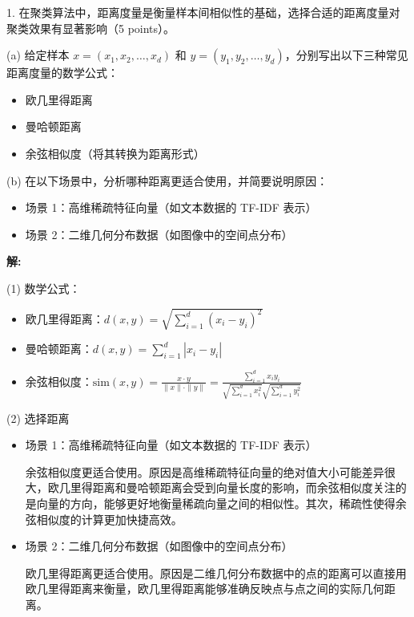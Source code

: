 \documentclass[8pt]{article}
\begin{document}
1. 
在聚类算法中，距离度量是衡量样本间相似性的基础，选择合适的距离度量对聚类效果有显著影响（5 points）。  

(a) 给定样本 \( x = (x_1, x_2, \dots, x_d) \) 和 \( y = (y_1, y_2, \dots, y_d) \)，分别写出以下三种常见距离度量的数学公式： 
\begin{itemize}
    \item 欧几里得距离  
    \item 曼哈顿距离
    \item 余弦相似度（将其转换为距离形式）  
\end{itemize}

(b) 在以下场景中，分析哪种距离更适合使用，并简要说明原因：  
\begin{itemize}
    \item 场景 1：高维稀疏特征向量（如文本数据的 TF-IDF 表示）   
    \item 场景 2：二维几何分布数据（如图像中的空间点分布）  
\end{itemize}

\textbf{\large 解:}

(1) 数学公式：
\begin{itemize}
    \item 欧几里得距离：\( d(x, y) = \sqrt{\sum_{i=1}^d (x_i - y_i)^2} \)
    \item 曼哈顿距离：\( d(x, y) = \sum_{i=1}^d |x_i - y_i| \)
    \item 余弦相似度：\( \text{sim}(x, y) = \frac{x \cdot y}{\|x\| \cdot \|y\|} = \frac{\sum_{i=1}^{d}{x_i y_i}}{
        \sqrt{\sum_{i=1}^{d}{x_i^2}} \sqrt{\sum_{i=1}^{d}{y_i^2}}
    } \) 
\end{itemize}

(2) 选择距离

\begin{itemize}
    \item 场景 1：高维稀疏特征向量（如文本数据的 TF-IDF 表示）

    余弦相似度更适合使用。原因是高维稀疏特征向量的绝对值大小可能差异很大，欧几里得距离和曼哈顿距离会受到向量长度的影响，而余弦相似度关注的是向量的方向，能够更好地衡量稀疏向量之间的相似性。其次，稀疏性使得余弦相似度的计算更加快捷高效。

    \item 场景 2：二维几何分布数据（如图像中的空间点分布）

    欧几里得距离更适合使用。原因是二维几何分布数据中的点的距离可以直接用欧几里得距离来衡量，欧几里得距离能够准确反映点与点之间的实际几何距离。
\end{itemize}
\vspace{3em}
\end{document}
